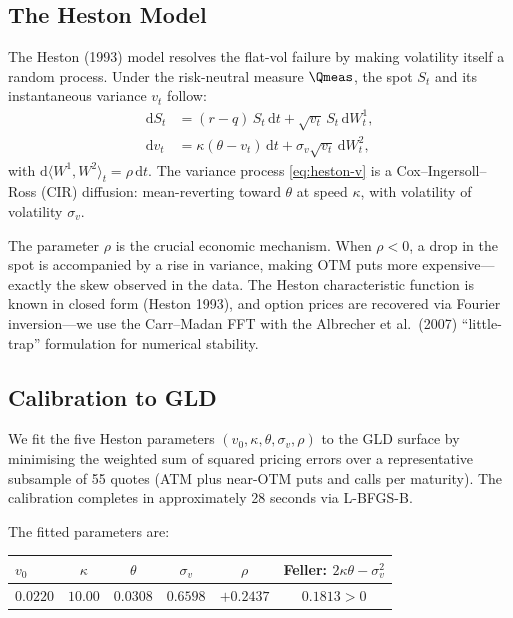 \documentclass[12pt, a4paper]{article}
\begin{document}
\subsection{The Heston Model}
\label{subsec:heston-theory}

The Heston (1993) model resolves the flat-vol failure by making volatility itself a random process. Under the risk-neutral measure $\Qmeas$, the spot $S_t$ and its instantaneous variance $v_t$ follow:
\begin{align}
\mathrm{d}S_t &= (r-q)\,S_t\,\mathrm{d}t + \sqrt{v_t}\,S_t\,\mathrm{d}W_t^1, \label{eq:heston-s}\\
\mathrm{d}v_t &= \kappa(\theta - v_t)\,\mathrm{d}t + \sigma_v\sqrt{v_t}\,\mathrm{d}W_t^2, \label{eq:heston-v}
\end{align}
with $\mathrm{d}\langle W^1,W^2\rangle_t = \rho\,\mathrm{d}t$. The variance process \eqref{eq:heston-v} is a Cox--Ingersoll--Ross (CIR) diffusion: mean-reverting toward $\theta$ at speed $\kappa$, with volatility of volatility $\sigma_v$.

The parameter $\rho$ is the crucial economic mechanism. When $\rho < 0$, a drop in the spot is accompanied by a rise in variance, making OTM puts more expensive---exactly the skew observed in the data. The Heston characteristic function is known in closed form (Heston 1993), and option prices are recovered via Fourier inversion---we use the Carr--Madan FFT with the Albrecher et al.\ (2007) ``little-trap'' formulation for numerical stability.

\subsection{Calibration to GLD}

We fit the five Heston parameters $(v_0,\kappa,\theta,\sigma_v,\rho)$ to the GLD surface by minimising the weighted sum of squared pricing errors over a representative subsample of 55 quotes (ATM plus near-OTM puts and calls per maturity). The calibration completes in approximately 28 seconds via L-BFGS-B.

The fitted parameters are:
\begin{center}
\begin{tabular}{@{}lccccc@{}}\toprule
$v_0$ & $\kappa$ & $\theta$ & $\sigma_v$ & $\rho$ & Feller: $2\kappa\theta-\sigma_v^2$\\
\midrule
$0.0220$ & $10.00$ & $0.0308$ & $0.6598$ & $+0.2437$ & $0.1813>0$\\
\bottomrule
\end{tabular}
\end{center}
\end{document}
